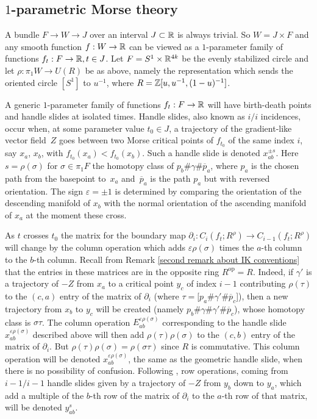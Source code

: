 \documentclass[11pt]{article}
\numberwithin{equation}{section}\providecommand{\dpl}{\displaystyle}
\newcommand{\op}{\mathrm{op}}
\theoremstyle{plain}
\theoremstyle{definition}
\let\ve\varepsilon
\begin{document}
\subsection{$1$-parametric Morse theory}

A bundle $F\to W\to J$ over an interval $J\subset \mathbb{R}$ is always trivial. So $W=J\times F$ and any smooth function $f:W\to\mathbb{R}$ can be viewed as a $1$-parameter family of functions $f_t:F\to\mathbb{R}, t\in J$. Let $F=S^1\times \mathbb{R}^{4k}$ be the evenly stabilized circle and let $\rho:\pi_1W \to U(R)$ be as above, namely the representation which sends the oriented circle $[S^1]$ to $u^{-1}$, where $R=\mathbb{Z}[u,u^{-1},(1-u)^{-1}]$.

A generic $1$-parameter family of functions $f_t:F\to \mathbb{R}$ will have birth-death points and handle slides at isolated times. Handle slides, also known as $i/i$ incidences, occur when, at some parameter value $t_0 \in J$, a trajectory of the gradient-like vector field~$Z$ goes between two Morse critical points of $f_{t_0}$ of the same index $i$, say $x_a$, $x_b$, with $f_{t_0}(x_a)<f_{t_0}(x_b)$. Such a handle slide is denoted $x_{ab}^{\pm s}$. Here $s=\rho(\sigma)$ for $\sigma\in \pi_1 F$ the homotopy class of $p_b\# \gamma \# \overline {p}_a$, where $p_a$ is the chosen path from the basepoint to~$x_a$ and~$\overline{p}_a$ is the path $p_a$ but with reversed orientation. The sign $\ve=\pm 1$ is determined by comparing the orientation of the descending manifold of $x_b$ with the normal orientation of the ascending manifold of $x_a$ at the moment these cross.

As $t$ crosses $t_0$ the matrix for the boundary map $\partial_i:C_i(f_t;R^\rho)\to C_{i-1}(f_t;R^\rho)$ will change by the column operation which adds $\varepsilon \rho(\sigma)$ times the $a$-th column to the $b$-th column. Recall from Remark \ref{second remark about IK conventions} that the entries in these matrices are in the opposite ring $R^{\op}=R$. Indeed, if $\gamma'$ is a trajectory of $-Z$ from $x_a$ to a critical point $y_c$ of index $i-1$ contributing $\rho(\tau)$ to the $(c,a)$ entry of the matrix of $\partial_i$ (where $\tau=[p_a\# \gamma' \# \overline{p}_c$]), then a new trajectory from $x_b$ to $y_c$ will be created (namely $p_b\# \gamma\# \gamma' \# \overline{p}_c$), whose homotopy class is $\sigma\tau$. The column operation $E_{ab}^{\varepsilon \rho(\sigma)}$ corresponding to the handle slide~$x_{ab}^{\varepsilon\rho(\sigma)}$ described above will then add $\rho(\tau)\rho(\sigma)$ to the $(c,b)$ entry of the matrix of $\partial_i$. But $\rho(\tau)\rho(\sigma)=\rho(\sigma\tau)$ since $R$ is commutative. This column operation will be denoted $x_{ab}^{\varepsilon\rho(\sigma)}$, the same as the geometric handle slide, when there is no possibility of confusion. Following \cite{IK93}, row operations, coming from $i-1/i-1$ handle slides given by a trajectory of $-Z$ from $y_b$ down to $y_a$, which add a multiple of the $b$-th row of the matrix of $\partial_i$ to the $a$-th row of that matrix, will be denoted $y_{ab}^s$.
\end{document}
